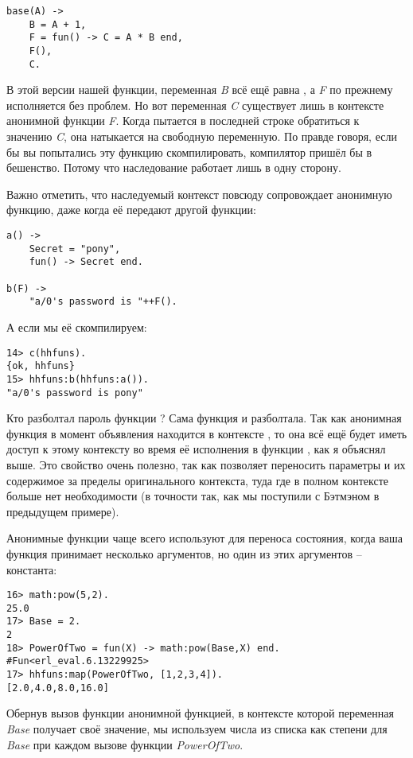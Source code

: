 \begin{lstlisting}[style=erlang]
base(A) ->
    B = A + 1,
    F = fun() -> C = A * B end,
    F(),
    C.
\end{lstlisting}

В этой версии нашей функции, переменная \emph{B} всё ещё равна , а \emph{F} по прежнему исполняется без проблем. Но вот переменная \emph{C} существует лишь в контексте анонимной функции \emph{F}. Когда  пытается в последней строке обратиться к значению \emph{C}, она натыкается на свободную переменную. По правде говоря, если бы вы попытались эту функцию скомпилировать, компилятор пришёл бы в бешенство. Потому что наследование работает лишь в одну сторону.

Важно отметить, что наследуемый контекст повсюду сопровождает анонимную функцию, даже когда её передают другой функции:
\begin{lstlisting}[style=erlang]
a() ->
    Secret = "pony",
    fun() -> Secret end.
 
b(F) ->
    "a/0's password is "++F().
\end{lstlisting}

А если мы её скомпилируем:
\begin{lstlisting}[style=erlang]
14> c(hhfuns).
{ok, hhfuns}
15> hhfuns:b(hhfuns:a()).
"a/0's password is pony"
\end{lstlisting}

Кто разболтал пароль функции ? Сама функция  и разболтала. Так как анонимная функция в момент объявления находится в контексте , то она всё ещё будет иметь доступ к этому контексту во время её исполнения в функции , как я объяснял выше. Это свойство очень полезно, так как позволяет переносить параметры и их содержимое за пределы оригинального контекста, туда где в полном контексте больше нет необходимости (в точности так, как мы поступили с Бэтмэном в предыдущем примере).

Анонимные функции чаще всего используют для переноса состояния, когда ваша функция принимает несколько аргументов, но один из этих аргументов \--- константа:
\begin{lstlisting}[style=erlang]
16> math:pow(5,2).
25.0
17> Base = 2.
2
18> PowerOfTwo = fun(X) -> math:pow(Base,X) end.
#Fun<erl_eval.6.13229925>
17> hhfuns:map(PowerOfTwo, [1,2,3,4]).
[2.0,4.0,8.0,16.0]
\end{lstlisting}

Обернув вызов функции  анонимной функцией, в контексте которой переменная \emph{Base} получает своё значение, мы используем числа из списка как степени для \emph{Base} при каждом вызове функции \emph{PowerOfTwo}.

